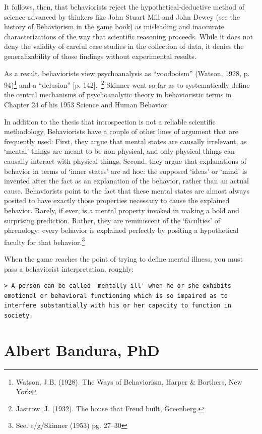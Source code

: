 \begin{refsection}
It follows, then, that behaviorists reject the hypothetical-deductive method of science advanced by thinkers like John Stuart Mill and John Dewey (see the history of Behaviorism in the game book) as misleading and inaccurate characterizations of the way that scientific reasoning proceeds. While it does not deny the validity of careful case studies in the collection of data, it denies the generalizability of those findings without experimental results.

As a result, behaviorists view psychoanalysis as ``voodooism'' (Watson, 1928, p. 94)\footnote{Watson, J.B. (1928). The Ways of Behaviorism, Harper \& Borthers, New York} and a ``delusion'' [p. 142].~\citep{Jastrow:1932wl}\footnote{Jastrow, J. (1932). The house that Freud built, Greenberg.} Skinner went so far as to systematically define the central mechanisms of psychoanalytic theory in behavioristic terms in Chapter 24 of his 1953 Science and Human Behavior.

In addition to the thesis that introspection is not a reliable scientific methodology, Behaviorists have a couple of other lines of argument that are frequently used: First, they argue that mental states are causally irrelevant, as `mental' things are meant to be non-physical, and only physical things can causally interact with physical things. Second, they argue that explanations of behavior in terms of `inner states' are ad hoc: the supposed `ideas' or `mind' is invented after the fact as an explanation of the behavior, rather than an actual cause. Behaviorists point to the fact that these mental states are almost always posited to have exactly those properties necessary to cause the explained behavior. Rarely, if ever, is a mental property invoked in making a bold and surprising prediction. Rather, they are reminiscent of the `faculties' of phrenology: every behavior is explained perfectly by positing a hypothetical faculty for that behavior.\footnote{See. e\slash g\slash  Skinner (1953) pg. 27--30} 

When the game reaches the point of trying to define mental illness, you must pass a behaviorist interpretation, roughly:

\begin{verbatim}
> A person can be called 'mentally ill' when he or she exhibits emotional or behavioral functioning which is so impaired as to interfere substantially with his or her capacity to function in society. 
\end{verbatim}

\chapter{Albert Bandura, PhD}
\label{albertbanduraphd}


\end{refsection}
